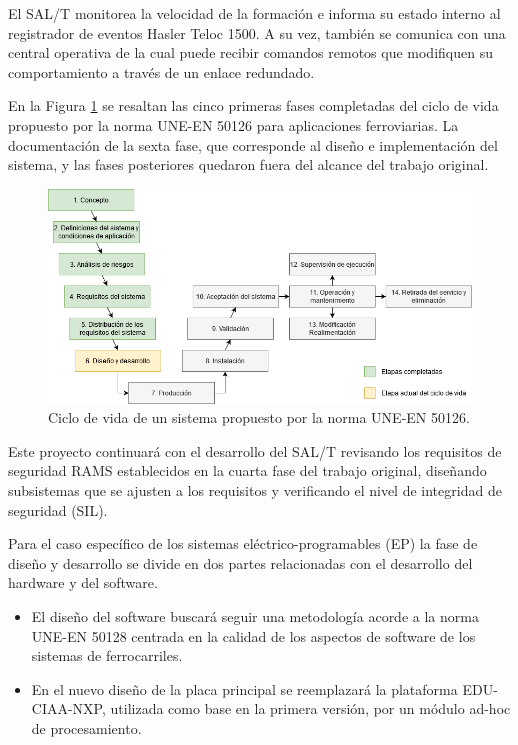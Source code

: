 \documentclass[11pt]{charter}
\begin{document}
El SAL/T monitorea la velocidad de la formación e informa su estado interno al registrador de eventos Hasler Teloc 1500.
A su vez, también se comunica con una central operativa de la cual puede recibir comandos remotos que modifiquen su comportamiento
a través de un enlace redundado.

En la Figura \ref{fig:ciclo_de_vida_50126} se resaltan las cinco primeras fases completadas del ciclo de vida propuesto 
por la norma UNE-EN 50126 para aplicaciones ferroviarias. La documentación de la sexta fase, que corresponde al diseño 
e implementación del sistema, y las fases posteriores quedaron fuera del alcance del trabajo original.

\vspace{10px}

\begin{figure}[htpb]
\centering 
\includegraphics[width=1\textwidth]{./Figuras/ciclo_de_vida_50126.png}
\caption{Ciclo de vida de un sistema propuesto por la norma UNE-EN 50126.}
\label{fig:ciclo_de_vida_50126}
\end{figure}

\vspace{10px}

Este proyecto continuará con el desarrollo del SAL/T revisando los requisitos de seguridad RAMS establecidos en la cuarta fase 
del trabajo original, diseñando subsistemas que se ajusten a los requisitos y verificando el nivel de integridad 
de seguridad (SIL).

Para el caso específico de los sistemas eléctrico-programables (EP) la fase de diseño y desarrollo se divide en dos 
partes relacionadas con el desarrollo del hardware y del software.

\begin{itemize}
\item El diseño del software buscará seguir una metodología acorde a la norma UNE-EN 50128 centrada en la calidad de los 
aspectos de software de los sistemas de ferrocarriles.
\item En el nuevo diseño de la placa principal se reemplazará la plataforma EDU-CIAA-NXP, utilizada como base en la primera 
versión, por un módulo ad-hoc de procesamiento.
\end{itemize}
\end{document}
